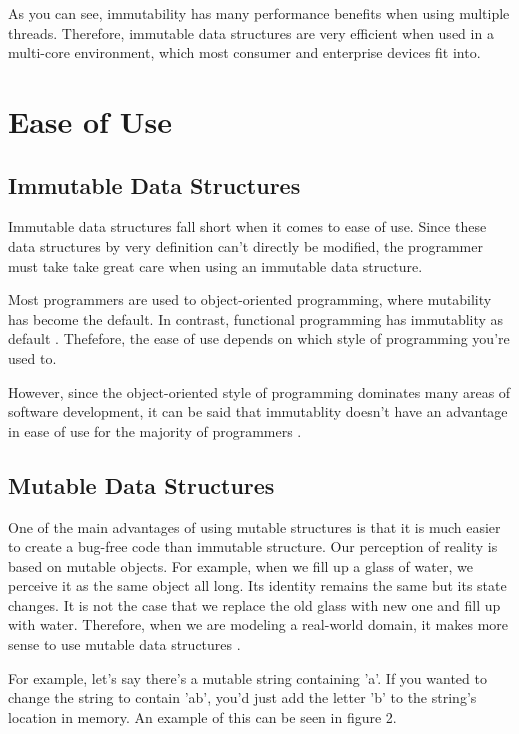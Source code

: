 \documentclass[11pt]{article}
\begin{document}
As you can see, immutability has many performance benefits when using multiple
threads. Therefore, immutable data structures are very efficient when used in a
multi-core environment, which most consumer and enterprise devices fit into.

\section{Ease of Use}
\subsection{Immutable Data Structures}
Immutable data structures fall short when it comes to ease of use. Since these
data structures by very definition can't directly be modified, the programmer
must take take great care when using an immutable data structure.

Most programmers are used to object-oriented programming, where mutability has
become the default. In contrast, functional programming has immutablity as
default \cite{miles}. Thefefore, the ease of use depends on which style of
programming you're used to.

However, since the object-oriented style of programming dominates many areas
of software development, it can be said that immutablity doesn't have an
advantage in ease of use for the majority of programmers \cite{ieee_spectrum}.

\subsection{Mutable Data Structures}
One of the main advantages of using mutable structures is that it is much
easier to create a bug-free code than immutable structure. Our perception of
reality is based on mutable objects.  For example, when we fill up a glass of
water, we perceive it as the same object all long.  Its identity remains the
same but its state changes.  It is not the case that we replace the old glass
with new one and fill up with water.  Therefore, when we are modeling a
real-world domain, it makes more sense to use mutable data structures
\cite{peter_toro}.

For example, let's say there's a mutable string containing 'a'. If you wanted
to change the string to contain 'ab', you'd just add the letter 'b' to the
string's location in memory. An example of this can be seen in figure 2.
\end{document}
